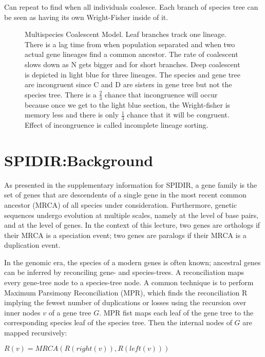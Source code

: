 \noindent Can repeat to find when all individuals coalesce. Each
branch of species tree can be seen as having its own Wright-Fisher
inside of it.

\begin{figure} [ht!] 
  \centering 
  \caption{Multispecies Coalescent Model. Leaf branches track one
    lineage. There is a lag time from when population separated and
    when two actual gene lineages find a common ancestor. The rate of
    coalescent slows down as N gets bigger and for short
    branches. Deep coalescent is depicted in light blue for three
    lineages. The species and gene tree are incongruent since C and D
    are sisters in gene tree but not the species tree. There is a
    $\frac{2}{3}$ chance that incongruence will occur because once we
    get to the light blue section, the Wright-fisher is memory less
    and there is only $\frac{1}{3}$ chance that it will be
    congruent. Effect of incongruence is called incomplete lineage
    sorting.}
  \label{Fig17_MultispeciesCoalescent}
\end{figure} 

\section{SPIDIR:Background} 
As presented in the supplementary information for SPIDIR, a gene
family is the set of genes that are descendents of a single gene in
the most recent common ancestor (MRCA) of all species under
consideration. Furthermore, genetic sequences undergo evolution at
multiple scales, namely at the level of base pairs, and at the level
of genes. In the context of this lecture, two genes are orthologs if
their MRCA is a speciation event; two genes are paralogs if their MRCA
is a duplication event.

In the genomic era, the species of a modern genes is often known;
ancestral genes can be inferred by reconciling gene- and
species-trees. A reconciliation maps every gene-tree node to a
species-tree node. A common technique is to perform Maximum Parsimony
Reconciliation (MPR), which finds the reconciliation R implying the
fewest number of duplications or losses using the recursion over inner
nodes $v$ of a gene tree $G$. MPR fist maps each leaf of the gene tree
to the corresponding species leaf of the species tree. Then the
internal nodes of $G$ are mapped recursively:

$R(v) = MRCA(R(right(v)),R(left(v)))$

